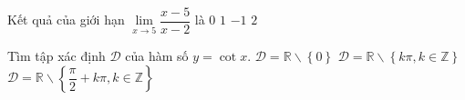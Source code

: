 \begin{ex}%
	Kết quả của giới hạn $\lim\limits_{x\to 5} \dfrac{x-5}{x-2}$ là
	\choice
	{\True $0$}
	{$1$}
	{$-1$}
	{$2$}
\end{ex}

\begin{ex}%
	Tìm tập xác định $\mathscr{D}$ của hàm số $y=\cot x$.
	{$\mathscr{D}=\mathbb{R}\backslash \left\{0\right\}$}
	{\True $\mathscr{D}=\mathbb{R}\backslash \left\{k\pi, k\in \mathbb{Z}\right\}$}
	{$\mathscr{D}=\mathbb{R}\backslash \left\{\dfrac{\pi}{2}+k\pi, k\in \mathbb{Z}\right\}$}
\end{ex}

